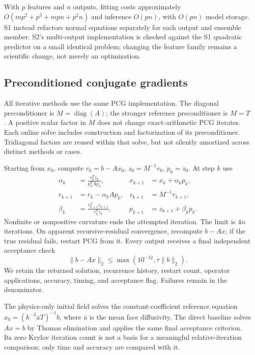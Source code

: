 With $p$ features and $n$ outputs, fitting costs approximately $O(mp^2+p^3+mpn+p^2n)$ and inference $O(pn)$, with $O(pn)$ model storage. S1 instead refactors normal equations separately for each output and ensemble member. S2's multi-output implementation is checked against the S1 quadratic predictor on a small identical problem; changing the feature family remains a scientific change, not merely an optimization.

\subsection{Preconditioned conjugate gradients}
All iterative methods use the same PCG implementation. The diagonal preconditioner is $M=\operatorname{diag}(A)$; the stronger reference preconditioner is $M=T$. A positive scalar factor in $M$ does not change exact-arithmetic PCG iterates. Each online solve includes construction and factorization of its preconditioner. Tridiagonal factors are reused within that solve, but not silently amortized across distinct methods or cases.

Starting from $x_0$, compute $r_0=b-Ax_0$, $z_0=M^{-1}r_0$, $p_0=z_0$. At step $k$ use
\begin{align}
 \alpha_k&=\frac{r_k^Tz_k}{p_k^TAp_k},&x_{k+1}&=x_k+\alpha_kp_k,\\
 r_{k+1}&=r_k-\alpha_kAp_k,&z_{k+1}&=M^{-1}r_{k+1},\\
 \beta_k&=\frac{r_{k+1}^Tz_{k+1}}{r_k^Tz_k},&p_{k+1}&=z_{k+1}+\beta_kp_k.
\end{align}
Nonfinite or nonpositive curvature ends the attempted iteration. The limit is $4n$ iterations. On apparent recursive-residual convergence, recompute $b-Ax$; if the true residual fails, restart PCG from it. Every output receives a final independent acceptance check
\begin{equation}
 \|b-Ax\|_2\le\max(10^{-12},\tau\|b\|_2).
\end{equation}
We retain the returned solution, recurrence history, restart count, operator applications, accuracy, timing, and acceptance flag. Failures remain in the denominator.

The physics-only initial field solves the constant-coefficient reference equation
$x_0=(h^{-2}\bar a T)^{-1}b$, where $\bar a$ is the mean face diffusivity. The direct baseline solves $Ax=b$ by Thomas elimination and applies the same final acceptance criterion. Its zero Krylov iteration count is not a basis for a meaningful relative-iteration comparison; only time and accuracy are compared with it.
